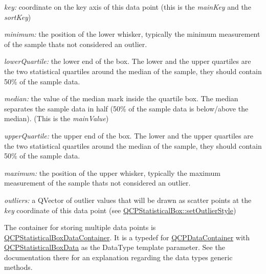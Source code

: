 \begin{DoxyItemize}
\item {\itshape key\+:} coordinate on the key axis of this data point (this is the {\itshape main\+Key} and the {\itshape sort\+Key})\end{DoxyItemize}
\begin{DoxyItemize}
\item {\itshape minimum\+:} the position of the lower whisker, typically the minimum measurement of the sample that\textquotesingle{}s not considered an outlier.\end{DoxyItemize}
\begin{DoxyItemize}
\item {\itshape lower\+Quartile\+:} the lower end of the box. The lower and the upper quartiles are the two statistical quartiles around the median of the sample, they should contain 50\% of the sample data.\end{DoxyItemize}
\begin{DoxyItemize}
\item {\itshape median\+:} the value of the median mark inside the quartile box. The median separates the sample data in half (50\% of the sample data is below/above the median). (This is the {\itshape main\+Value})\end{DoxyItemize}
\begin{DoxyItemize}
\item {\itshape upper\+Quartile\+:} the upper end of the box. The lower and the upper quartiles are the two statistical quartiles around the median of the sample, they should contain 50\% of the sample data.\end{DoxyItemize}
\begin{DoxyItemize}
\item {\itshape maximum\+:} the position of the upper whisker, typically the maximum measurement of the sample that\textquotesingle{}s not considered an outlier.\end{DoxyItemize}
\begin{DoxyItemize}
\item {\itshape outliers\+:} a Q\+Vector of outlier values that will be drawn as scatter points at the {\itshape key} coordinate of this data point (see \hyperlink{class_q_c_p_statistical_box_ad5241943422eb8e58360a97e99ad6aa7}{Q\+C\+P\+Statistical\+Box\+::set\+Outlier\+Style})\end{DoxyItemize}
The container for storing multiple data points is \hyperlink{qcustomplot_8h_a8b773c0c35f8f924701ced6e9915e4c7}{Q\+C\+P\+Statistical\+Box\+Data\+Container}. It is a typedef for \hyperlink{class_q_c_p_data_container}{Q\+C\+P\+Data\+Container} with \hyperlink{class_q_c_p_statistical_box_data}{Q\+C\+P\+Statistical\+Box\+Data} as the Data\+Type template parameter. See the documentation there for an explanation regarding the data type\textquotesingle{}s generic methods.

